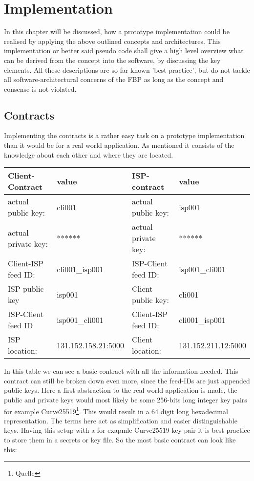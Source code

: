 \chapter{Implementation}
In this chapter will be discussed, how a prototype implementation could be realised by applying the above outlined concepts and architectures. This implementation or better said pseudo code shall give a high level overview what can be derived from the concept into the software, by discussing the key elements. All these descriptions are so far known 'best practice', but do not tackle all software-architectural concerns of the FBP as long as the concept and consense is not violated.
\section{Contracts}
Implementing the contracts is a rather easy task on a prototype implementation than it would be for a real world application. As mentioned it consists of the knowledge about each other and where they are located. 
\begin{center}
    \begin{tabular}{llll} \toprule
        Client-Contract&value&ISP-contract&value\\ \midrule
        actual public key:& cli001 &  actual public key: &isp001  \\ 
        actual private key:& ****** & actual private key:& ****** \\
        Client-ISP feed ID:& cli001\_isp001 &ISP-Client feed ID:&isp001\_cli001 \\ 
        ISP public key&isp001&Client public key:&cli001\\
        ISP-Client feed ID&isp001\_cli001&Client-ISP feed ID:&cli001\_isp001\\
        ISP location:&131.152.158.21:5000 &Client location:& 131.152.211.12:5000 \\\bottomrule
    \end{tabular}
\end{center}

In this table we can see a basic contract with all the information needed. This contract can still be broken down even more, since the feed-IDs are just appended public keys. Here a first abstraction to the real world application is made, the public and private keys would most likely be some 256-bits long integer key pairs for example Curve25519\footnote{Quelle}. This would result in a 64 digit long hexadecimal representation. The terms here act as simplification and easier distinguishable keys. Having this setup with a for exapmle Curve25519 key pair it is best practice to store them in a secrets or key file. So the most basic contract can look like this:

